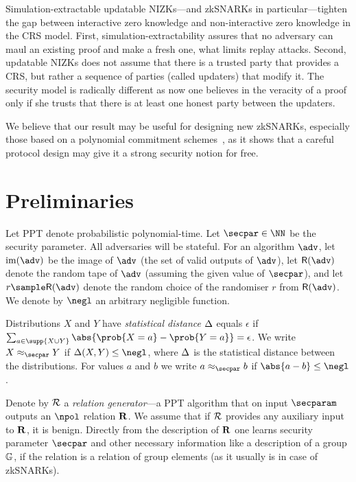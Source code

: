 \documentclass[runningheads,11pt]{llncs}
\theoremstyle{definition}
\begin{document}
Simulation-extractable updatable NIZKs---and zkSNARKs in particular---tighten the gap between interactive zero knowledge and non-interactive zero knowledge in the CRS model.
First, simulation-extractability assures that no adversary can maul an existing proof and make a fresh one, what limits replay attacks.
Second, updatable NIZKs does not assume that there is a trusted party that
provides a CRS, but rather a sequence of parties (called updaters) that modify
it. The security model is radically different as now one believes in the
veracity of a proof only if she trusts that there is at least one honest party
between the updaters. 

We believe that our result may be useful for designing new zkSNARKs, especially those based on a polynomial commitment schemes~\cite{AC:KatZavGol10}, as it shows that a careful protocol design may give it a strong security notion for free.

\section{Preliminaries}
Let PPT denote probabilistic polynomial-time.
Let $\secpar \in \NN$ be the security parameter.
All adversaries will be stateful.
For an algorithm $\adv$, let $\image (\adv)$ be the image of $\adv$ (the set of valid outputs of $\adv$), let $\RND{\adv}$ denote the random tape of $\adv$ (assuming the given value of $\secpar$), and let $r \sample \RND{\adv}$ denote the random choice of the randomiser $r$ from $\RND{\adv}$.
We denote by $\negl$ an arbitrary negligible function.

Distributions $X$ and $Y$ have \emph{statistical distance} $\Delta$ equals $\epsilon$ if $\sum_{a \in \supp{X \cup Y}} \abs{\prob{X = a} - \prob{Y = a}} = \epsilon$.
We write $X \approx_\secpar Y$ if $\SD(X, Y) \leq \negl$, where $\Delta$ is the statistical distance between the distributions.
For values $a$ and $b$ we write $a \approx_\secpar b$ if $\abs{a - b} \leq \negl$.

Denote by $\mathcal{R}$ a \emph{relation generator}---a PPT algorithm that on input $\secparam$ outputs an $\npol$ relation $\mathbf{R}$. We assume that if $\mathcal{R}$ provides any auxiliary input to $\mathbf{R}$, it is benign. Directly from the description of $\mathbf{R}$ one learns security parameter $\secpar$ and other necessary information like a description of a group $\mathbb{G}$, if the relation is a relation of group elements (as it usually is in case of zkSNARKs).
\end{document}
